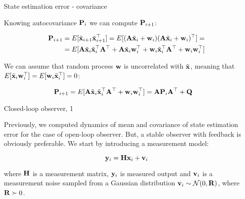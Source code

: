 \documentclass{beamer}
\newcommand{\btil}[1] {\Tilde{\mathbf{#1}}}
\begin{document}
\begin{frame}{State estimation error - covariance}
	\begin{flushleft}
		
		Knowing autocovariance $\mathbf{P}_i$ we can compute $\mathbf{P}_{i+1}$:
		
		\begin{align*}
			\bo{P}_{i+1} &= E[\btil{x}_{i+1}\btil{x}_{i+1}\T] = 
			E[(\bo{A} \btil{x}_i + \bo{w}_i) (\bo{A} \btil{x}_i + \bo{w}_i)\T] = 
			\\
			&=
			E[\bo{A} \btil{x}_i \btil{x}_i\T \bo{A}\T +
			\bo{A} \btil{x}_i \bo{w}_i\T + 
			\bo{w}_i \btil{x}_i\T \bo{A}\T +
			\bo{w}_i \bo{w}_i\T]
		\end{align*}
		
		We can assume that random process $\mathbf{w}$ is uncorrelated with $\btil{x}$, meaning that $E[\btil{x}_i \bo{w}_i\T] = E[\bo{w}_i \btil{x}_i\T] = 0$:
		
		\begin{align*}
			\bo{P}_{i+1} 
			&=
			E[\bo{A} \btil{x}_i \btil{x}_i\T \bo{A}\T +
			\bo{w}_i \bo{w}_i\T] 
			= 
			\bo{A} \bo{P}_i \bo{A}\T +
			\bo{Q}
		\end{align*}
		
		
	\end{flushleft}
\end{frame}



\begin{frame}{Closed-loop observer, 1}
	\begin{flushleft}
		
		Previously, we computed dynamics of mean and covariance of state estimation error for the case of open-loop observer. But, a stable observer with feedback is obviously preferable. We start by introducing a measurement model:
		
		\begin{equation}
			\mathbf{y}_i = \mathbf{H} \mathbf{x}_i + \mathbf{v}_i
		\end{equation}
		
		where $\mathbf{H}$ is a measurement matrix, $\mathbf{y}_i$ is measured output and $\mathbf{v}_i$ is a measurement noise sampled from a Gaussian distribution $\mathbf{v}_i \sim \mathcal{N} (0, \mathbf{R})$, where $\mathbf{R} \succ 0$.
		
	\end{flushleft}
\end{frame}
\end{document}
